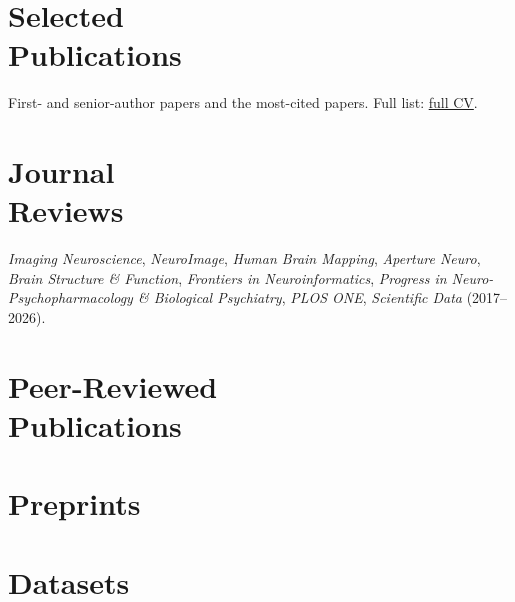 \documentclass[margin1,line,canadian]{resume}
\newif\ifshortcv
\providecommand{\selectedkeys}{}
\begin{document}
\begin{resume}
\ifshortcv
 \section{\mysidestyle{}Selected\\Publications}
 \begin{refsection}
  \newrefcontext[sorting=ymdnt]
  \expandafter\nocite\expandafter{\selectedkeys}
  \printbibliography[heading=none]
 \end{refsection}
 First- and senior-author papers and the most-cited papers. Full list: \href{https://github.com/gdevenyi/curriculumvitae/blob/master/cv.pdf}{full CV}.

 \section{\mysidestyle{}Journal\\Reviews}
 \textsl{Imaging Neuroscience}, \textsl{NeuroImage}, \textsl{Human Brain Mapping}, \textsl{Aperture Neuro},
 \textsl{Brain Structure \& Function}, \textsl{Frontiers in Neuroinformatics}, \textsl{Progress in Neuro-Psychopharmacology
 \& Biological Psychiatry}, \textsl{PLOS ONE}, \textsl{Scientific Data} (2017--2026).
\else
 \section{\mysidestyle{}Peer-Reviewed\\Publications}
 \begin{refsection}
  \newrefcontext[sorting=ymdnt]
  \nocite{*}
  \printbibliography[heading=none]
 \end{refsection}
 \section{\mysidestyle{}Preprints}
 \begin{refsection}
  \newrefcontext[sorting=ymdnt]
  \nocite{*}
  \printbibliography[heading=none]
 \end{refsection}
 \section{\mysidestyle{}Datasets}
 \begin{refsection}
  \newrefcontext[sorting=ymdnt]
  \nocite{*}
  \printbibliography[heading=none]
 \end{refsection}

\end{resume}
\end{document}
